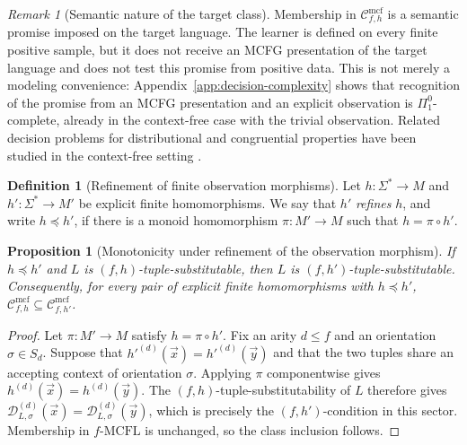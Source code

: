 \documentclass[11pt,a4paper]{article}
\numberwithin{equation}{section}
\theoremstyle{plain}
\newtheorem{proposition}[theorem]{Proposition}
\theoremstyle{definition}
\newtheorem{definition}[theorem]{Definition}
\theoremstyle{remark}
\newtheorem{remark}[theorem]{Remark}
\newcommand{\Cmcf}[2]{\mathcal{C}^{\mathrm{mcf}}_{#1,#2}}
\newcommand{\D}{\mathcal{D}}
\newcommand{\tuple}[1]{\vec{#1}}
\begin{document}
\begin{remark}[Semantic nature of the target class]
\label{rem:semantic-class}
Membership in \(\Cmcf{f}{h}\) is a semantic promise imposed on the target
language.  The learner is defined on every finite positive sample, but it does
not receive an MCFG presentation of the target language and does not test this
promise from positive data.  This is not merely a modeling convenience: Appendix~\ref{app:decision-complexity}
shows that recognition of the promise from an MCFG presentation and an explicit
observation is $\Pi^0_1$-complete, already in the context-free case with the
trivial observation.  Related decision problems for distributional and
congruential properties have been studied in the context-free setting
\cite{ClarkEyraud2007,Clark2017,KanazawaKappe2019}.
\end{remark}

\begin{definition}[Refinement of finite observation morphisms]
\label{def:h-refinement}
Let \(h\colon\Sigma^*\to M\) and \(h'\colon\Sigma^*\to M'\) be explicit finite
homomorphisms.  We say that \(h'\) \emph{refines} \(h\), and write
\(h\preceq h'\), if there is a monoid homomorphism
\(\pi\colon M'\to M\) such that \(h=\pi\circ h'\).
\end{definition}

\begin{proposition}[Monotonicity under refinement of the observation morphism]
\label{prop:h-refinement-monotonicity}
If \(h\preceq h'\) and \(L\) is \((f,h)\)-tuple-substitutable, then \(L\) is
\((f,h')\)-tuple-substitutable.  Consequently, for every pair of explicit
finite homomorphisms with \(h\preceq h'\),
\(\Cmcf{f}{h}\subseteq \Cmcf{f}{h'}\).
\end{proposition}

\begin{proof}
Let \(\pi\colon M'\to M\) satisfy \(h=\pi\circ h'\).  Fix an arity
\(d\le f\) and an orientation \(\sigma\in S_d\).  Suppose that
\(h'^{(d)}(\tuple x)=h'^{(d)}(\tuple y)\) and that the two tuples share an
accepting context of orientation \(\sigma\).  Applying \(\pi\) componentwise
gives \(h^{(d)}(\tuple x)=h^{(d)}(\tuple y)\).  The
\((f,h)\)-tuple-substitutability of \(L\) therefore gives
\(\D_{L,\sigma}^{(d)}(\tuple x)=\D_{L,\sigma}^{(d)}(\tuple y)\), which is
precisely the \((f,h')\)-condition in this sector.  Membership in
\(f\text{-}\mathrm{MCFL}\) is unchanged, so the class inclusion follows.
\end{proof}
\end{document}
